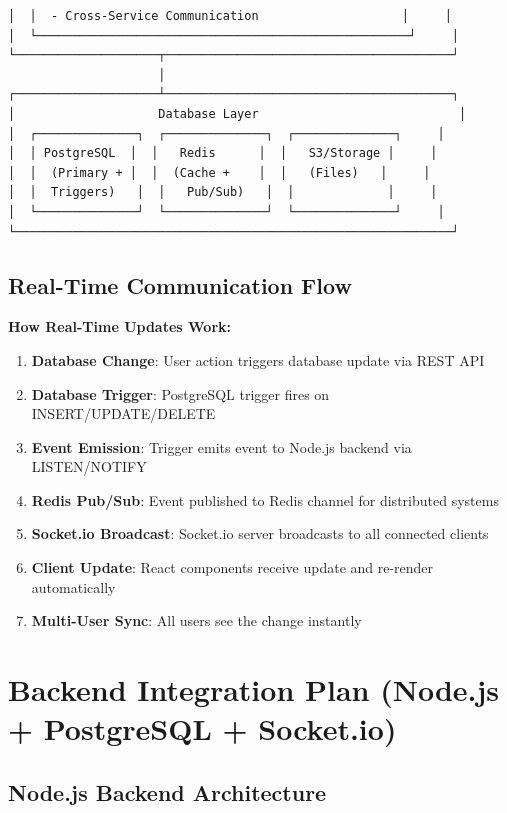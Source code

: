 \documentclass[11pt,a4paper]{article}
\begin{document}
\begin{codebox}
\begin{verbatim}
│  │  - Cross-Service Communication                    │     │
│  └────────────────────────────────────────────────────┘     │
└────────────────────┬────────────────────────────────────────┘
                     │
┌────────────────────┴────────────────────────────────────────┐
│                    Database Layer                            │
│  ┌──────────────┐  ┌──────────────┐  ┌──────────────┐     │
│  │ PostgreSQL  │  │   Redis      │  │   S3/Storage │     │
│  │  (Primary + │  │  (Cache +    │  │   (Files)   │     │
│  │  Triggers)   │  │   Pub/Sub)   │  │             │     │
│  └──────────────┘  └──────────────┘  └──────────────┘     │
└─────────────────────────────────────────────────────────────┘
\end{verbatim}
\end{codebox}

\subsection{Real-Time Communication Flow}
\begin{realtimebox}
\textbf{How Real-Time Updates Work:}
\begin{enumerate}
    \item \textbf{Database Change}: User action triggers database update via REST API
    \item \textbf{Database Trigger}: PostgreSQL trigger fires on INSERT/UPDATE/DELETE
    \item \textbf{Event Emission}: Trigger emits event to Node.js backend via LISTEN/NOTIFY
    \item \textbf{Redis Pub/Sub}: Event published to Redis channel for distributed systems
    \item \textbf{Socket.io Broadcast}: Socket.io server broadcasts to all connected clients
    \item \textbf{Client Update}: React components receive update and re-render automatically
    \item \textbf{Multi-User Sync}: All users see the change instantly
\end{enumerate}
\end{realtimebox}

\section{Backend Integration Plan (Node.js + PostgreSQL + Socket.io)}

\subsection{Node.js Backend Architecture}
\end{document}
